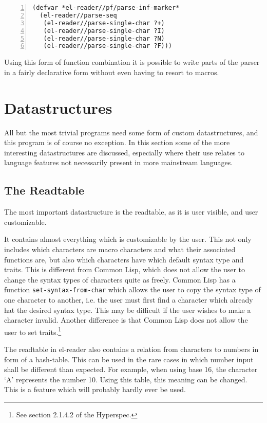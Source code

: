 \documentclass[a4paper,10pt,twoside]{report}
\newcommand{\cl}{Common Lisp}
\newcommand{\elr}{el-reader}
\newcommand{\fun}[1]{\texttt{#1}}
\begin{document}
\begin{lstlisting}[style=lispcode,label={code:parse-inf-marker},caption={Parse
    ``+INF''},numbers=left]
(defvar *el-reader//pf/parse-inf-marker*
  (el-reader//parse-seq
   (el-reader//parse-single-char ?+)
   (el-reader//parse-single-char ?I)
   (el-reader//parse-single-char ?N)
   (el-reader//parse-single-char ?F)))
\end{lstlisting}

Using this form of function combination it is possible to write parts of the
parser in a fairly declarative form without even having to resort to macros.

\section{Datastructures}
\label{sec:datastructures}

All but the most trivial programs need some form of custom datastructures, and
this program is of course no exception.  In this section some of the more
interesting datastructures are discussed, especially where their use relates to
language features not necessarily present in more mainstream languages.

\subsection{The Readtable}
\label{subsec:readtable-class}

The most important datastructure is the readtable, as it is user visible, and
user customizable.

It contains almost everything which is customizable by the user.  This not only
includes which characters are macro characters and what their associated
functions are, but also which characters have which default syntax type and
traits.  This is different from \cl{}, which does not allow the user to change
the syntax types of characters quite as freely.  \cl{} has a function
\fun{set-syntax-from-char} which allows the user to copy the syntax type of one
character to another, i.e. the user must first find a character which already
hat the desired syntax type.  This may be difficult if the user wishes to make a
character invalid.  Another difference is that \cl{} does not allow the user to
set traits.\footnote{See section 2.1.4.2 of the Hyperspec.}

The readtable in \elr{} also contains a relation from characters to numbers in
form of a hash-table.  This can be used in the rare cases in which number input
shall be different than expected.  For example, when using base 16, the
character `A' represents the number 10.  Using this table, this meaning can be
changed.  This is a feature which will probably hardly ever be used.
\end{document}
